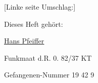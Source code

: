 \def\day{{\color{red} [Das Schreibheft wird nun gewendet und wiederum nur alle rechten Seiten beschrieben] }}
\mktitle

{\color{red} [Linke seite Umschlag:] }


\begin{center}
Dieses Heft geh\"{o}rt:

\ul{\ul{Hans Pfeiffer}}

Funkmaat d.R.
0. 82/37 KT

Gefangenen-Nummer
19 42  9
\end{center}
\clearpage
